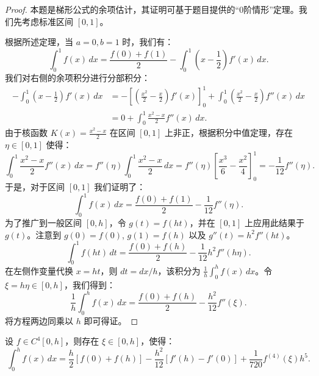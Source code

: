 \documentclass[lang=cn,10pt,thmcnt=section]{elegantbook}
\begin{document}
	\begin{proof}
		本题是梯形公式的余项估计，其证明可基于题目提供的“0阶情形”定理。我们先考虑标准区间 \([0, 1]\)。
	
		根据所述定理，当 $a=0, b=1$ 时，我们有：
		\[
		\int_0^1 f(x) \, dx = \frac{f(0) + f(1)}{2} - \int_0^1 \left(x - \frac{1}{2}\right) f'(x) \, dx.
		\]
		我们对右侧的余项积分进行分部积分：
		\begin{align*}
			-\int_0^1 \left(x - \frac{1}{2}\right) f'(x) \, dx &= - \left[ \left(\frac{x^2}{2} - \frac{x}{2}\right) f'(x) \right]_0^1 + \int_0^1 \left(\frac{x^2}{2} - \frac{x}{2}\right) f''(x) \, dx \\
			&= 0 + \int_0^1 \frac{x^2-x}{2} f''(x) \, dx.
		\end{align*}
		由于核函数 $K(x) = \frac{x^2-x}{2}$ 在区间 $[0,1]$ 上非正，根据积分中值定理，存在 $\eta \in [0,1]$ 使得：
		\[
		\int_0^1 \frac{x^2-x}{2} f''(x) \, dx = f''(\eta) \int_0^1 \frac{x^2-x}{2} \, dx = f''(\eta) \left[ \frac{x^3}{6} - \frac{x^2}{4} \right]_0^1 = -\frac{1}{12} f''(\eta).
		\]
		于是，对于区间 $[0,1]$ 我们证明了：
		\[
		\int_0^1 f(x) \, dx = \frac{f(0)+f(1)}{2} - \frac{1}{12}f''(\eta).
		\]
		为了推广到一般区间 $[0,h]$，令 $g(t) = f(ht)$，并在 $[0,1]$ 上应用此结果于 $g(t)$。注意到 $g(0)=f(0)$, $g(1)=f(h)$ 以及 $g''(t)=h^2 f''(ht)$。
		\[
		\int_0^1 f(ht) \, dt = \frac{f(0)+f(h)}{2} - \frac{1}{12}h^2 f''(h\eta).
		\]
		在左侧作变量代换 $x=ht$，则 $dt=dx/h$，该积分为 $\frac{1}{h}\int_0^h f(x) \, dx$。令 $\xi = h\eta \in [0,h]$，我们得到：
		\[
		\frac{1}{h}\int_0^h f(x) \, dx = \frac{f(0)+f(h)}{2} - \frac{h^2}{12}f''(\xi).
		\]
		将方程两边同乘以 $h$ 即可得证。
	\end{proof}
\begin{example}
	设 \( f \in C^4[0, h] \)，则存在 \( \xi \in [0, h] \)，使得：
\[
\int_0^h f(x) \, dx = \frac{h}{2} [f(0) + f(h)] - \frac{h^2}{12} [f'(h) - f'(0)] + \frac{1}{720} f^{(4)}(\xi) h^5.
\]
\end{example}
\end{document}
